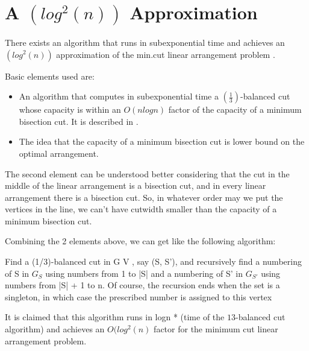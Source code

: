 \section{A $(log^2(n))$ Approximation}

There exists an algorithm that runs in subexponential time and achieves an
$(log^2(n))$ approximation of the min.cut linear arrangement problem  \cite{vazi01}.

Basic elements used are:

\begin{itemize}

\item An algorithm that computes in subexponential time a $(\frac{1}{3})$-balanced cut whose capacity is within an $O(nlogn)$
factor of the capacity of a minimum bisection cut. It is described in \cite{vazi01}.
\item The idea that the capacity of a minimum bisection cut is lower bound on the optimal arrangement. 
\end{itemize}

The second element can be understood better considering that the cut in the middle of the linear arrangement is a bisection
cut, and in every linear arrangement there is a bisection cut. So, in whatever order may we put the vertices in the line, 
we can't have cutwidth smaller than the capacity of a minimum bisection cut.

Combining the 2 elements above, we can get like the following algorithm:
 
 Find a (1/3)-balanced cut in G V , say (S, S'),
 and recursively find a numbering of S in $G_S$ using numbers from 1 to |S|
 and a numbering of S' in $G_{S'}$ using numbers from |S| + 1 to n. Of course,
 the recursion ends when the set is a singleton, in which case the prescribed
 number is assigned to this vertex

It is claimed that this algorithm runs in logn * (time of the ${1}{3}$-balanced cut algorithm) and achieves an $O(log^2(n)$ factor for the minimum cut linear arrangement problem.


